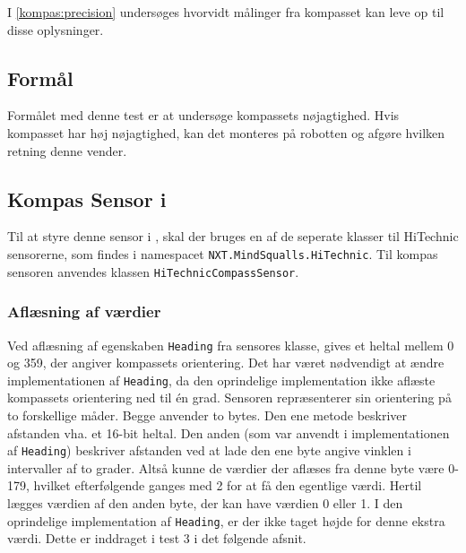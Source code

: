 I \cref{kompas:precision} undersøges hvorvidt målinger fra kompasset kan leve op til disse oplysninger.

\subsection{Formål}
Formålet med denne test er at undersøge kompassets nøjagtighed.
Hvis kompasset har høj nøjagtighed, kan det monteres på robotten og afgøre hvilken retning denne vender.

\subsection{Kompas Sensor i \mindsqualls}
Til at styre denne sensor i \mindsqualls, skal der bruges en af de seperate klasser til HiTechnic sensorerne, som findes i namespacet \lstinline[style=csharp]!NXT.MindSqualls.HiTechnic!.
Til kompas sensoren anvendes klassen \lstinline[style=csharp]!HiTechnicCompassSensor!.

\subsubsection{Aflæsning af værdier}\label{kompas:reading}
Ved aflæsning af egenskaben \lstinline[style=csharp]!Heading! fra sensores klasse, gives et heltal mellem 0 og 359, der angiver kompassets orientering.
Det har været nødvendigt at ændre implementationen af \lstinline[style=csharp]!Heading!, da den oprindelige implementation ikke aflæste kompassets orientering ned til \'en grad.
Sensoren repræsenterer sin orientering på to forskellige måder.
Begge anvender to bytes.
Den ene metode beskriver afstanden vha. et 16-bit heltal.
Den anden (som var anvendt i implementationen af \lstinline[style=csharp]!Heading!) beskriver afstanden ved at lade den ene byte angive vinklen i intervaller af to grader.
Altså kunne de værdier der aflæses fra denne byte være 0-179, hvilket efterfølgende ganges med 2 for at få den egentlige værdi.
Hertil lægges værdien af den anden byte, der kan have værdien 0 eller 1.
I den oprindelige implementation af \lstinline[style=csharp]!Heading!, er der ikke taget højde for denne ekstra værdi.
Dette er inddraget i test 3 i det følgende afsnit.

